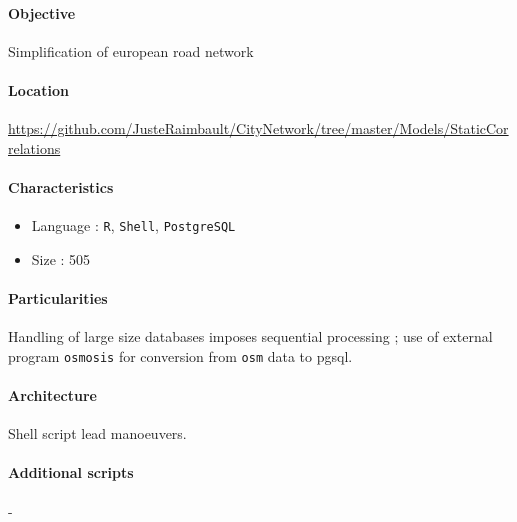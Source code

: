 \paragraph{Objective}

Simplification of european road network

\paragraph{Location}

\url{https://github.com/JusteRaimbault/CityNetwork/tree/master/Models/StaticCorrelations}

\paragraph{Characteristics}

\begin{itemize}
\item Language : \texttt{R}, \texttt{Shell}, \texttt{PostgreSQL}
\item Size : 505
\end{itemize}


\paragraph{Particularities}

Handling of large size databases imposes sequential processing ; use of external program \texttt{osmosis} for conversion from \texttt{osm} data to pgsql.

\paragraph{Architecture}

Shell script lead manoeuvers.

\paragraph{Additional scripts}

-



